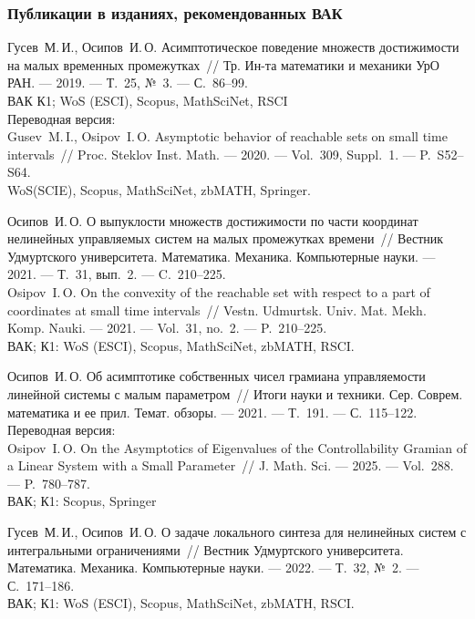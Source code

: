 \documentclass[../main.tex]{subfiles}
\begin{document}
\begin{thebibliography}{99}
\subsubsection*{Публикации в изданиях, рекомендованных ВАК}
Гусев~М.\,И., Осипов~И.\,О. Асимптотическое поведение множеств достижимости на малых временных промежутках~// Тр. Ин-та математики и механики УрО РАН. --- 2019. --- Т.~25, №~3. --- С.~86--99.
 \\
ВАК К1; WoS (ESCI), Scopus, MathSciNet, RSCI
\\ Переводная версия: \\
Gusev~M.\,I., Osipov~I.\,O. Asymptotic behavior of reachable sets on small time intervals~// Proc. Steklov Inst. Math. --- 2020. --- Vol.~309, Suppl.~1. --- P.~S52--S64.  \\
WoS(SCIE), Scopus, MathSciNet, zbMATH, Springer.

Осипов~И.\,О. О выпуклости множеств достижимости по части координат нелинейных управляемых систем на малых промежутках времени~// Вестник Удмуртского университета. Математика. Механика. Компьютерные науки. --- 2021. --- Т.~31, вып.~2. --- C.~210--225.
\\
Osipov~I.\,O. On the convexity of the reachable set with respect to a part of coordinates at small time intervals~// Vestn. Udmurtsk. Univ. Mat. Mekh. Komp. Nauki. --- 2021. --- Vol.~31, no.~2. --- P.~210--225.
 \\
 ВАК; К1: WoS (ESCI), Scopus, MathSciNet, zbMATH, RSCI.

Осипов~И.\,О. Об асимптотике собственных чисел грамиана управляемости линейной системы с малым параметром~// Итоги науки и техники. Сер. Соврем. математика и ее прил. Темат. обзоры. --- 2021. --- Т.~191. --- С.~115--122.
\\Переводная версия: \\
Osipov~I.\,O. On the Asymptotics of Eigenvalues of the Controllability Gramian of a Linear System with a Small Parameter~// J. Math. Sci. --- 2025. --- Vol.~288. --- P.~780--787. 
 \\
ВАК; К1: Scopus, Springer

Гусев~М.\,И., Осипов~И.\,О. О задаче локального синтеза для нелинейных систем с интегральными ограничениями~// Вестник Удмуртского университета. Математика. Механика. Компьютерные науки. --- 2022. --- Т.~32, №~2. --- С.~171--186. 
 \\
 ВАК; К1: WoS (ESCI), Scopus, MathSciNet, zbMATH, RSCI.



\end{thebibliography}
\end{document}

